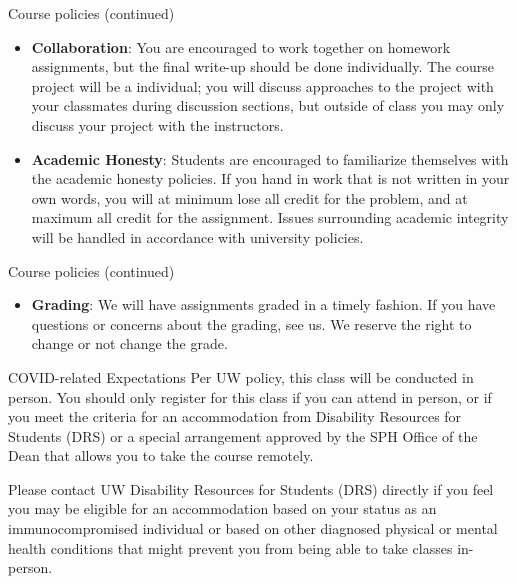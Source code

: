 \documentclass[10pt,t]{beamer}
\begin{document}
\begin{frame}{Course policies (continued)}
\begin{itemize}
	\item \textbf{Collaboration}: You are encouraged to work together on homework assignments, but the final write-up should be done individually. The course project will be a individual; you will discuss approaches to the project with your classmates during discussion sections, but outside of class you may only discuss your project with the instructors.
	\item \textbf{Academic Honesty}: Students are encouraged to familiarize themselves with the academic honesty policies. If you hand in work that is not written in your own words, you will at minimum lose all credit for the problem, and at maximum all credit for the assignment. Issues surrounding academic integrity will be handled in accordance with university policies.
\end{itemize}
\end{frame}

\begin{frame}{Course policies (continued)}
\begin{itemize}
	\item \textbf{Grading}: We will have assignments graded in a timely fashion. If you have questions or concerns about the grading, see us. We reserve the right to change or not change the grade.
\end{itemize}
\end{frame}

\begin{frame}{COVID-related Expectations}
Per UW policy, this class will be conducted in person. You should only register for this class if you can attend in person, or if you meet the criteria for an accommodation from Disability Resources for Students (DRS) or a special arrangement approved by the SPH Office of the Dean that allows you to take the course remotely. 

\vspace{0.3cm}

Please contact UW Disability Resources for Students (DRS) directly if you feel you may be eligible for an accommodation based on your status as an immunocompromised individual or based on other diagnosed physical or mental health conditions that might prevent you from being able to take classes in-person. 

\end{frame}
\end{document}
